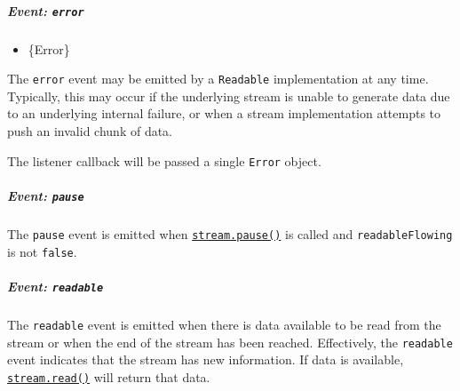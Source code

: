 \subparagraph{\texorpdfstring{Event:
\texttt{\textquotesingle{}error\textquotesingle{}}}{Event: \textquotesingle error\textquotesingle{}}}\label{event-error-1}

\begin{itemize}
\tightlist
\item
  \{Error\}
\end{itemize}

The \texttt{\textquotesingle{}error\textquotesingle{}} event may be
emitted by a \texttt{Readable} implementation at any time. Typically,
this may occur if the underlying stream is unable to generate data due
to an underlying internal failure, or when a stream implementation
attempts to push an invalid chunk of data.

The listener callback will be passed a single \texttt{Error} object.

\subparagraph{\texorpdfstring{Event:
\texttt{\textquotesingle{}pause\textquotesingle{}}}{Event: \textquotesingle pause\textquotesingle{}}}\label{event-pause}

The \texttt{\textquotesingle{}pause\textquotesingle{}} event is emitted
when \hyperref[readablepause]{\texttt{stream.pause()}} is called and
\texttt{readableFlowing} is not \texttt{false}.

\subparagraph{\texorpdfstring{Event:
\texttt{\textquotesingle{}readable\textquotesingle{}}}{Event: \textquotesingle readable\textquotesingle{}}}\label{event-readable}

The \texttt{\textquotesingle{}readable\textquotesingle{}} event is
emitted when there is data available to be read from the stream or when
the end of the stream has been reached. Effectively, the
\texttt{\textquotesingle{}readable\textquotesingle{}} event indicates
that the stream has new information. If data is available,
\hyperref[readablereadsize]{\texttt{stream.read()}} will return that
data.

\begin{Shaded}
\begin{Highlighting}[]
\OperatorTok{=} \NormalTok{()}\OperatorTok{;}
\NormalTok{(}\OperatorTok{,} \NormalTok{() \{}
  \OperatorTok{;}

  \OperatorTok{=} \NormalTok{()) }\OperatorTok{!==} \NormalTok{) \{}
    \OperatorTok{;}
\NormalTok{  \}}
\NormalTok{\})}\OperatorTok{;}
\end{Highlighting}
\end{Shaded}

